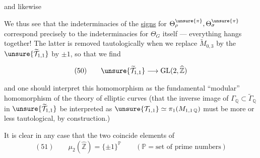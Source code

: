 and likewise 

We thus see that the indeterminacies of the \uline{signs} for
$\Theta_{\rho}^{\unsure{\pi}},\Theta_{\sigma}^{\unsure{\pi}}$
correspond precisely to the indeterminacies for $\Theta_G$
itself --- everything hangs together! The latter is removed
 tautologically when we replace
$\widetilde M_{0,3}$ by the 
 $\unsure{\widetilde{\mathcal T}_{1,1}}$ by $\pm1$,
so that we find

\[
(50)\qquad \unsure{\widetilde{\mathcal T}_{1,1}}
\longrightarrow \mathrm{GL}(2,\widehat{\mathbb Z})
\]

and one should  interpret this homomorphism
as the fundamental ``modular'' homomorphism of the theory of elliptic
curves (that the inverse image of \deleted{$\unsure{\Gamma}$}
$\Gamma_{\mathbb Q}\subset\widetilde\Gamma_{\mathbb Q}$ in
$\unsure{\widetilde{\mathcal T}_{1,1}}$  be interpreted as
$\unsure{\mathcal T_{1,1}}\simeq\pi_1(M_{1,1\,\mathbb Q})$
must be more or less tautological, by construction.)

It is clear in any case that the two coincide
  elements of
\[
(51)\qquad \mu_2(\widehat{\mathbb Z})=\{\pm1\}^{\mathbb P}
\qquad (\mathbb P=\text{set of prime numbers})
\]

